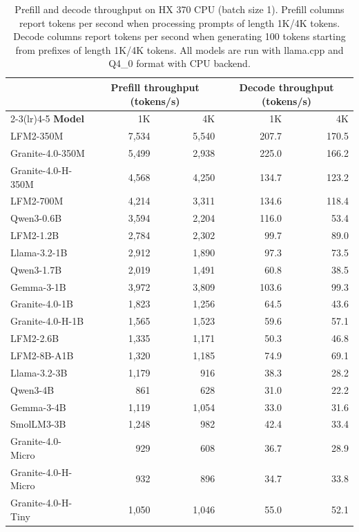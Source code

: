 \documentclass{article}
\begin{document}
\begin{table}[H]
\centering
\small
\begin{tabular}{lrrrr}
\toprule
& \multicolumn{2}{c}{\textbf{Prefill throughput (tokens/s)}} & \multicolumn{2}{c}{\textbf{Decode throughput (tokens/s)}}\\
\cmidrule(lr){2-3}\cmidrule(lr){4-5}
\textbf{Model} & 1K & 4K & 1K & 4K \\
\midrule
LFM2-350M & 7,534 & 5,540 & 207.7 & 170.5\\
Granite-4.0-350M & 5,499 & 2,938 & 225.0 & 166.2\\
Granite-4.0-H-350M & 4,568 & 4,250 & 134.7 & 123.2\\
\midrule
LFM2-700M & 4,214 & 3,311 & 134.6 & 118.4\\
Qwen3-0.6B & 3,594 & 2,204 & 116.0 & 53.4\\
\midrule
LFM2-1.2B & 2,784 & 2,302 & 99.7 & 89.0\\
Llama-3.2-1B  & 2,912 & 1,890 & 97.3 & 73.5\\
Qwen3-1.7B & 2,019 & 1,491 & 60.8 & 38.5\\
Gemma-3-1B  & 3,972 & 3,809 & 103.6 & 99.3\\
Granite-4.0-1B & 1,823 & 1,256 & 64.5 & 43.6\\
Granite-4.0-H-1B & 1,565 & 1,523 & 59.6 & 57.1\\
\midrule
LFM2-2.6B & 1,335 & 1,171 & 50.3 & 46.8\\
LFM2-8B-A1B & 1,320 & 1,185 & 74.9 & 69.1\\
Llama-3.2-3B  & 1,179 & 916 & 38.3 & 28.2\\
Qwen3-4B  & 861 & 628 & 31.0 & 22.2\\
Gemma-3-4B  & 1,119 & 1,054 & 33.0 & 31.6\\
SmolLM3-3B & 1,248 & 982 & 42.4 & 33.4\\
Granite-4.0-Micro & 929 & 608 & 36.7 & 28.9\\
Granite-4.0-H-Micro & 932 & 896 & 34.7 & 33.8\\
Granite-4.0-H-Tiny & 1,050 & 1,046 & 55.0 & 52.1\\
\bottomrule
\end{tabular}
\caption{Prefill and decode throughput on HX 370 CPU (batch size 1). Prefill columns report tokens per second when processing prompts of length 1K/4K tokens. Decode columns report tokens per second when generating 100 tokens starting from prefixes of length 1K/4K tokens. All models are run with llama.cpp and Q4\_0 format with CPU backend.}
\label{tab:hx370_inference}
\end{table}
\end{document}
